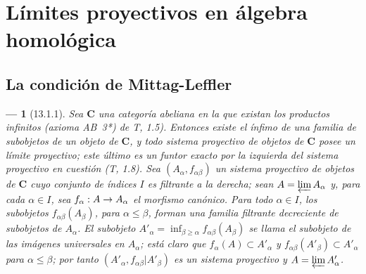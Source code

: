 \documentclass[10pt,oneside,openany]{book}
\theoremstyle{egaenv}\newtheorem*{env}{---}
\theoremstyle{egastatement}
\theoremstyle{egadescription}
\newcommand{\oldpage}[2][]{\marginnote{\normalfont\scriptsize\textbf{#1}\,|\,#2}\ignorespaces}
\renewcommand{\leq}{\leqslant}
\renewcommand{\geq}{\geqslant}
\renewcommand{\to}{\mathchoice{\longrightarrow}{\rightarrow}{\rightarrow}{\rightarrow}}
\begin{document}
\section{Límites proyectivos en álgebra homológica}
\label{section:0.13}
\label{section:0.13-fr}

\subsection{La condición de Mittag-Leffler}
\label{subsection:0.13.1}
\label{subsection:0.13.1-fr}

\begin{env}[13.1.1]
\label{0.13.1.1}
\label{0.13.1.1-fr}
Sea $\boldsymbol{C}$ una categoría abeliana en la que existan los productos
infinitos (axioma AB~3*) de T, 1.5).
Entonces existe el ínfimo de una familia de subobjetos de un objeto de
$\boldsymbol{C}$, y todo sistema proyectivo de objetos de $\boldsymbol{C}$ posee un
límite proyectivo; este último es un funtor exacto por la izquierda del
sistema proyectivo en cuestión (T, 1.8).
\oldpage[0\textsubscript{III}]{65}
Sea $(A_\alpha,f_{\alpha\beta})$ un sistema proyectivo de objetos de
$\boldsymbol{C}$ cuyo conjunto de índices $I$ es \emph{filtrante} a la derecha; sean $A=\varprojlim A_\alpha$
y, para cada $\alpha\in I$, sea
$f_\alpha:A\to A_\alpha$ el morfismo canónico.
Para todo $\alpha\in I$, los subobjetos
$f_{\alpha\beta}(A_\beta)$, para $\alpha\leq\beta$, forman una familia
filtrante decreciente de subobjetos de $A_\alpha$.
El subobjeto
$A'_\alpha=\inf_{\beta\geq\alpha}f_{\alpha\beta}(A_\beta)$
se llama el subobjeto de las \emph{imágenes universales} en $A_\alpha$; está claro que $f_\alpha(A)\subset A'_\alpha$ y $f_{\alpha\beta}(A'_\beta)\subset A'_\alpha$ para $\alpha\leq\beta$; por tanto
$(A'_\alpha,f_{\alpha\beta}|A'_\beta)$ es un sistema proyectivo y
$A=\varprojlim A'_\alpha$.
\end{env}
\end{document}
